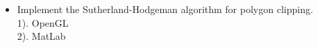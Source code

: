 


\usepackage[pdfauthor={Name}, pdftitle={Weekly}, pdfsubject={Week 1}, pdfkeywords={},colorlinks=true,urlcolor=black,linkcolor=black, citecolor=black]{hyperref}
\usepackage{listings}
\usepackage{subfig}
\usepackage{graphicx}




\renewcommand{\labelitemi}{\textcolor{main}{\small $\blacktriangleright$}}
\renewcommand{\labelitemii}{\textcolor{second}{\scriptsize \textbullet}}


\begin{enbref}
\begin{itemize}
\item Implement the Sutherland-Hodgeman algorithm for polygon clipping.\\
    1). OpenGL\\
    2). MatLab
\end{itemize}
\medskip
\end{enbref}

\vspace{0.5mm} \flushleft


